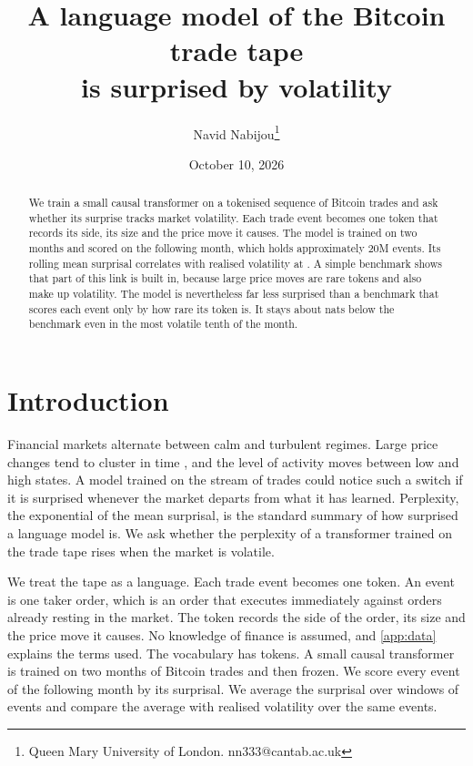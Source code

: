 \documentclass[11pt]{article}
\title{A language model of the Bitcoin trade tape\\is surprised by volatility}
\author{Navid Nabijou\thanks{Queen Mary University of London. nn333@cantab.ac.uk}}
\date{October 10, 2026}
\begin{document}
\maketitle

\begin{abstract}
\noindent
We train a small causal transformer on a tokenised sequence of Bitcoin trades and ask whether its surprise tracks market volatility.
Each trade event becomes one token that records its side, its size and the price move it causes.
The model is trained on two months and scored on the following month, which holds approximately 20M events.
Its rolling mean surprisal correlates with realised volatility at \Corr{}.
A simple benchmark shows that part of this link is built in, because large price moves are rare tokens and also make up volatility.
The model is nevertheless far less surprised than a benchmark that scores each event only by how rare its token is.
It stays about \GapHigh{} nats below the benchmark even in the most volatile tenth of the month.
\end{abstract}

\section{Introduction}

Financial markets alternate between calm and turbulent regimes.
Large price changes tend to cluster in time \citep{cont2007}, and the level of activity moves between low and high states.
A model trained on the stream of trades could notice such a switch if it is surprised whenever the market departs from what it has learned.
Perplexity, the exponential of the mean surprisal, is the standard summary of how surprised a language model is.
We ask whether the perplexity of a transformer trained on the trade tape rises when the market is volatile.

We treat the tape as a language.
Each trade event becomes one token.
An event is one taker order, which is an order that executes immediately against orders already resting in the market.
The token records the side of the order, its size and the price move it causes.
No knowledge of finance is assumed, and \cref{app:data} explains the terms used.
The vocabulary has \Vocab{} tokens.
A small causal transformer is trained on two months of Bitcoin trades and then frozen.
We score every event of the following month by its surprisal.
We average the surprisal over windows of \WinN{} events and compare the average with realised volatility over the same events.
\end{document}
